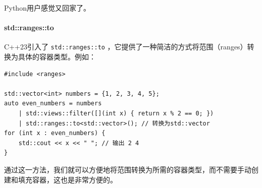 Python用户感觉又回家了。

\paragraph{std::ranges::to}

C++23引入了 \verb|std::ranges::to| ，它提供了一种简洁的方式将范围（ranges）转换为具体的容器类型。例如：
\begin{verbatim}
#include <ranges>

std::vector<int> numbers = {1, 2, 3, 4, 5};
auto even_numbers = numbers
    | std::views::filter([](int x) { return x % 2 == 0; })
    | std::ranges::to<std::vector>(); // 转换为std::vector
for (int x : even_numbers) {
    std::cout << x << " "; // 输出 2 4
}
\end{verbatim}
通过这一方法，我们就可以方便地将范围转换为所需的容器类型，而不需要手动创建和填充容器，这也是非常方便的。

